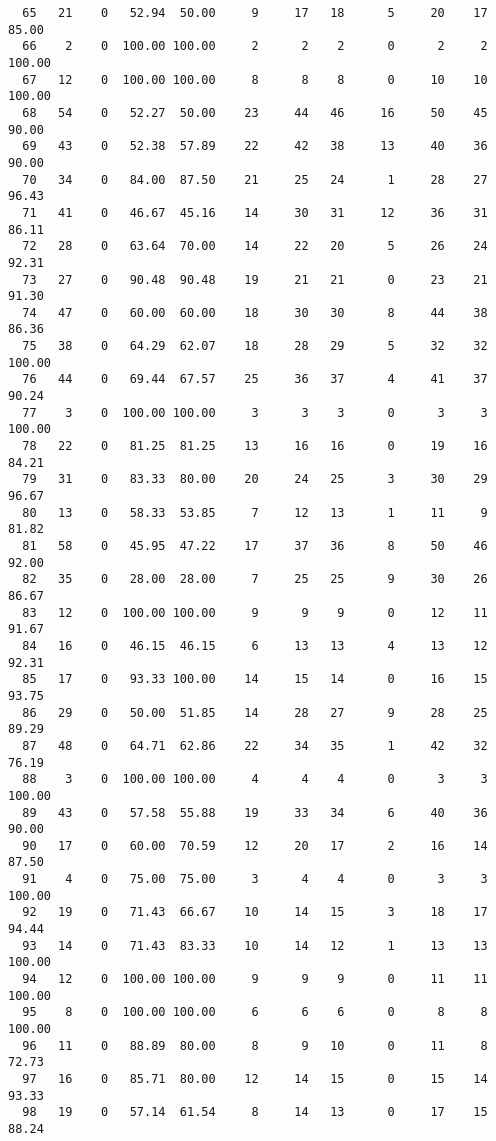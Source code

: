 \begin{verbatim}
  65   21    0   52.94  50.00     9     17   18      5     20    17    85.00
  66    2    0  100.00 100.00     2      2    2      0      2     2   100.00
  67   12    0  100.00 100.00     8      8    8      0     10    10   100.00
  68   54    0   52.27  50.00    23     44   46     16     50    45    90.00
  69   43    0   52.38  57.89    22     42   38     13     40    36    90.00
  70   34    0   84.00  87.50    21     25   24      1     28    27    96.43
  71   41    0   46.67  45.16    14     30   31     12     36    31    86.11
  72   28    0   63.64  70.00    14     22   20      5     26    24    92.31
  73   27    0   90.48  90.48    19     21   21      0     23    21    91.30
  74   47    0   60.00  60.00    18     30   30      8     44    38    86.36
  75   38    0   64.29  62.07    18     28   29      5     32    32   100.00
  76   44    0   69.44  67.57    25     36   37      4     41    37    90.24
  77    3    0  100.00 100.00     3      3    3      0      3     3   100.00
  78   22    0   81.25  81.25    13     16   16      0     19    16    84.21
  79   31    0   83.33  80.00    20     24   25      3     30    29    96.67
  80   13    0   58.33  53.85     7     12   13      1     11     9    81.82
  81   58    0   45.95  47.22    17     37   36      8     50    46    92.00
  82   35    0   28.00  28.00     7     25   25      9     30    26    86.67
  83   12    0  100.00 100.00     9      9    9      0     12    11    91.67
  84   16    0   46.15  46.15     6     13   13      4     13    12    92.31
  85   17    0   93.33 100.00    14     15   14      0     16    15    93.75
  86   29    0   50.00  51.85    14     28   27      9     28    25    89.29
  87   48    0   64.71  62.86    22     34   35      1     42    32    76.19
  88    3    0  100.00 100.00     4      4    4      0      3     3   100.00
  89   43    0   57.58  55.88    19     33   34      6     40    36    90.00
  90   17    0   60.00  70.59    12     20   17      2     16    14    87.50
  91    4    0   75.00  75.00     3      4    4      0      3     3   100.00
  92   19    0   71.43  66.67    10     14   15      3     18    17    94.44
  93   14    0   71.43  83.33    10     14   12      1     13    13   100.00
  94   12    0  100.00 100.00     9      9    9      0     11    11   100.00
  95    8    0  100.00 100.00     6      6    6      0      8     8   100.00
  96   11    0   88.89  80.00     8      9   10      0     11     8    72.73
  97   16    0   85.71  80.00    12     14   15      0     15    14    93.33
  98   19    0   57.14  61.54     8     14   13      0     17    15    88.24

\end{verbatim}
